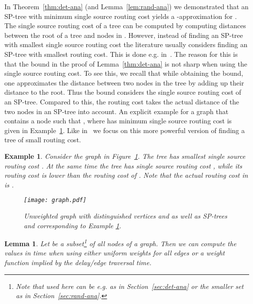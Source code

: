 \documentclass[11pt]{article}
\newtheorem{lemma}[theorem]{Lemma}
\newtheorem{example}[theorem]{Example}
\begin{document}
In Theorem~\ref{thm:det-ana} (and Lemma~\ref{lem:rand-ana}) we demonstrated that an SP-tree  with minimum single source routing cost yields a -approximation for . The single source routing cost of a tree can be computed by computing distances between the root of a tree and nodes in . However, instead of finding an SP-tree with smallest single source routing cost the literature usually considers finding an SP-tree with smallest routing cost. This is done e.g. in~\cite{wong1980worst}. The reason for this is that the bound in the proof of Lemma~\ref{thm:det-ana} is not sharp when using the single source routing cost. To see this, we recall that while obtaining the bound, one approximates the distance between two nodes in the tree by adding up their distance to the root. Thus the bound considers the single source routing cost of an SP-tree. Compared to this, the routing cost takes the actual distance of the two nodes in an SP-tree into account. An explicit example for a graph that contains a node  such that , where  has minimum single source routing cost is given in Example~\ref{ex:example22}. Like in~\cite{wong1980worst} we focus on this more powerful version of finding a tree of small routing cost. 

\begin{example}\label{ex:example22}
Consider the graph  in Figure~\ref{fig:example22}. The tree  has smallest single source routing cost . At the same time the tree  has single source routing cost , while its routing cost  is lower than the routing cost  of . Note that the actual routing cost in  is . 
\begin{figure}[!htb]
\begin{center}
\texttt{[image: graph.pdf]}
\caption{Unweighted graph  with distinguished vertices  and  as well as SP-trees  and  corresponding to Example \ref{ex:example22}.}
\label{fig:example22}
\end{center}
\end{figure} 
\end{example}




\begin{lemma}\label{lem:RC-comp}
Let  be a subset\footnote{Note that  used here can be e.g.  as in Section~\ref{sec:det-ana} or the smaller set  as in Section~\ref{sec:rand-ana}.}  of all nodes of a graph. Then we can compute the values  in time  when using either uniform weights for all edges or a weight function implied by the delay/edge traversal time.
\end{lemma}
\end{document}
